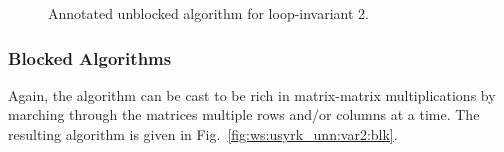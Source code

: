 \renewcommand{\beforeupdate}{
\FlaThreeByThreeBR{ C_{00} }        { c_{01} }         { C_{02} }
                  { \undetermined } { \gamma_{11}}     { c_{12}^T }
                  { \undetermined } { \undetermined }  { C_{22} }
=
\FlaTwoByTwo{ A_0 A_0^T + \hat{C}_{00}}
            { A_0
              \FlaTwoByOneSingleLine{ a_1^T }{ A_2 }^T +
              \FlaOneByTwoSingleLine{\hat{c}_{01}}
                                    {\hat{C}_{02} }
            }
            { \undetermined }
            { \FlaTwoByTwoSingleLine{ \hat{\gamma}_{11} }   { \hat{c}_{12}^{T} }
                                    { \undetermined}        { \hat{C}_{22}}}
\wedge \ldots
}

\renewcommand{\afterupdate}{
\FlaThreeByThreeTL{ C_{00} }        { c_{01} }         { C_{02} }
                  { \undetermined } { \gamma_{11}}     { c_{12}^T }
                  { \undetermined } { \undetermined }  { C_{22} }
=
\FlaTwoByTwo{
              \FlaTwoByTwoSingleLine { A_0 A_0^T + \hat{C}_{00}} { A_0 a_1 + \hat{c}_{01}}
                                     {\undetermined} { a_1^T a_1 + \hat{\gamma}_{11}}
            }
            {
              \FlaTwoByOneSingleLine{ A_0 A_2^T + \hat{C}_{02} }{ a_1^T A_2^T + \hat{c}_{12}^T }
            }
            { \undetermined }
            { \hat{C}_{22} }
\wedge \ldots
}

\renewcommand{\update}{
\begin{minipage}[t]{4in}
\noindent
$ \gamma_{11} \becomes a_1^T a_1 + \gamma_{11} $\\
$ c_{12} \becomes A_2 a_1 + c_{12} $\\
\end{minipage}
}

\begin{figure}[htbp]
\worksheet
\caption{Annotated unblocked algorithm for loop-invariant 2.}
\label{fig:ws:usyrk_unn:var2}
\end{figure}

\subsubsection{Blocked Algorithms}

Again, the algorithm can be cast to be rich in
matrix-matrix multiplications by marching through
the matrices multiple rows and/or columns at a time.
The resulting algorithm is given in 
Fig.~\ref{fig:ws:usyrk_unn:var2:blk}.

